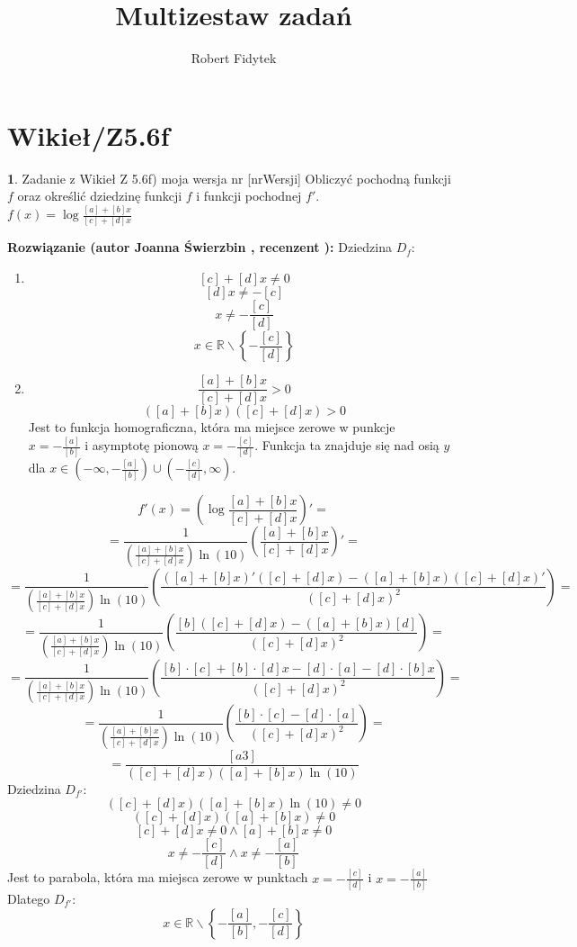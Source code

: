\documentclass[12pt, a4paper]{article}
\title{Multizestaw zadań}
\author{Robert Fidytek}
\date{}
\theoremstyle{definition} %
\newtheorem{zad}{}
\newcommand{\kategoria}[1]{\section{#1}} %
\newcommand{\zadStart}[1]{\begin{zad}#1\newline} %
\newcommand{\zadStop}{\end{zad}}   %
\newcommand{\rozwStart}[2]{\noindent \textbf{Rozwiązanie (autor #1 , recenzent #2): }\newline} %
\begin{document}
\maketitle


\kategoria{Wikieł/Z5.6f}
\zadStart{Zadanie z Wikieł Z 5.6f) moja wersja nr [nrWersji]}
Obliczyć pochodną funkcji $f$ oraz określić dziedzinę funkcji $f$ i funkcji pochodnej $f'$.\\
$f(x)=\log{\frac{[a]+[b]x}{[c]+[d]x}}$
\zadStop
\rozwStart{Joanna Świerzbin}{}
Dziedzina $D_f: $
\begin{enumerate}
\item $$[c]+[d]x \neq 0$$
$$[d]x \neq -[c]$$
$$x \neq -\frac{[c]}{[d]}$$
$$x\in \mathbb{R} \backslash \left\{ -\frac{[c]}{[d]} \right\} $$
\item $$ \frac{[a]+[b]x}{[c]+[d]x} >0 $$
$$ ([a]+[b]x)([c]+[d]x) >0 $$
Jest to funkcja homograficzna, która ma miejsce zerowe w punkcje \\ $x=-\frac{[a]}{[b]}$ i asymptotę pionową $x=-\frac{[c]}{[d]}$. Funkcja ta znajduje się nad osią $y$ dla $x \in \left( -\infty , -\frac{[a]}{[b]} \right) \cup \left( -\frac{[c]}{[d]}, \infty \right)$.
\end{enumerate}
$$ f'(x)=\left( \log{\frac{[a]+[b]x}{[c]+[d]x}}  \right)' =$$ 
$$= \frac{1}{\left(\frac{[a]+[b]x}{[c]+[d]x}\right)\ln(10)}\left( \frac{[a]+[b]x}{[c]+[d]x} \right)' =$$ 
$$= \frac{1}{\left(\frac{[a]+[b]x}{[c]+[d]x}\right)\ln(10)}\left( \frac{([a]+[b]x)'([c]+[d]x) - ([a]+[b]x) ([c]+[d]x)'}{([c]+[d]x)^2} \right) =$$ 
$$= \frac{1}{\left(\frac{[a]+[b]x}{[c]+[d]x}\right)\ln(10)}\left( \frac{[b]([c]+[d]x) - ([a]+[b]x) [d]}{([c]+[d]x)^2} \right) =$$ 
$$= \frac{1}{\left(\frac{[a]+[b]x}{[c]+[d]x}\right)\ln(10)}\left( \frac{[b]\cdot[c]+[b]\cdot[d]x - [d]\cdot[a]-[d]\cdot[b]x}{([c]+[d]x)^2} \right) =$$ 
$$= \frac{1}{\left(\frac{[a]+[b]x}{[c]+[d]x}\right)\ln(10)}\left( \frac{[b]\cdot[c] - [d]\cdot[a]}{([c]+[d]x)^2} \right) =$$ 
$$= \frac{[a3]}{([c]+[d]x) \left([a]+[b]x \right)\ln(10)} $$ 
Dziedzina $D_{f'}:$
$$ {([c]+[d]x) \left([a]+[b]x \right)\ln(10)} \neq 0 $$
$$ ([c]+[d]x) ([a]+[b]x) \neq 0 $$
$$ [c]+[d]x \neq 0 \land  [a]+[b]x \neq 0 $$
$$ x \neq -\frac{[c]}{[d]} \land  x \neq -\frac{[a]}{[b]} $$
Jest to parabola, która ma miejsca zerowe w punktach $ x = -\frac{[c]}{[d]}$ i $  x = -\frac{[a]}{[b]} $ Dlatego $D_{f'}:$
$$ x \in \mathbb{R} \backslash \left\{-\frac{[a]}{[b]}, -\frac{[c]}{[d]} \right\} $$
\end{document}
